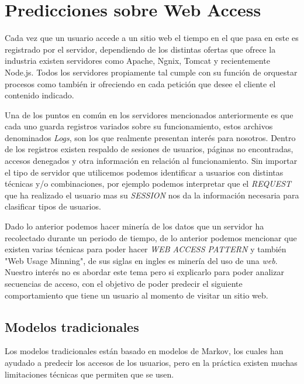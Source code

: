 \chapter[Predicciones sobre Web Access]{Predicciones sobre Web Access}
\label{ch:tema}


Cada vez que un usuario accede a un sitio web el tiempo en el que pasa en este es registrado
por el servidor, dependiendo de los distintas ofertas que ofrece la industria existen servidores como Apache, Ngnix, Tomcat
y recientemente Node.js. Todos los servidores propiamente tal cumple con su función de orquestar procesos
como también ir ofreciendo en cada petición que desee el cliente el contenido indicado.

Una de los puntos en común en los servidores mencionados anteriormente es que cada uno guarda registros variados sobre su funcionamiento,
estos archivos denominados \emph{Logs}, son los que realmente presentan interés para nosotros. Dentro de los registros existen respaldo de sesiones de usuarios, páginas no encontradas, accesos denegados y otra información en relación al funcionamiento. Sin importar el tipo de servidor que utilicemos podemos identificar a usuarios con distintas técnicas y/o combinaciones, por ejemplo podemos interpretar que el \emph{REQUEST} que ha realizado el usuario mas su \emph{SESSION} nos da la información necesaria para clasificar tipos de usuarios.

Dado lo anterior podemos hacer minería de los datos que un servidor ha recolectado durante un periodo de tiempo, de lo anterior  podemos mencionar que existen varias
técnicas para poder hacer \emph{WEB ACCESS PATTERN } y también  "Web Usage Minning", de sus siglas en ingles es minería del uso de una \emph{web}. Nuestro interés no es abordar este tema pero si explicarlo para poder analizar secuencias de acceso, con el objetivo de poder predecir el siguiente comportamiento que tiene un usuario al momento de visitar un sitio web.





\section{Modelos tradicionales}
 
Los modelos tradicionales están basado en modelos de Markov, los cuales han ayudado a predecir los accesos de los usuarios, pero en la práctica existen 
muchas limitaciones técnicas que permiten que se usen. 

